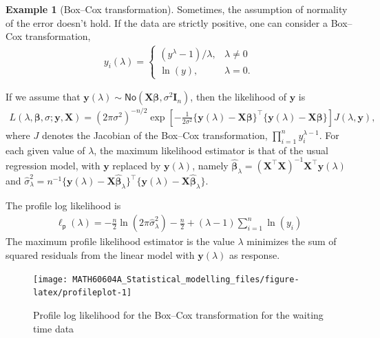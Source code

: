 \documentclass[
  11pt,
  letterpaper,
]{book}
\theoremstyle{definition}
\theoremstyle{definition}
\newtheorem{example}{Example}[chapter]
\theoremstyle{definition}
\theoremstyle{remark}
\begin{document}
\begin{example}[Box--Cox transformation]
\protect\hypertarget{exm:boxcox}{}{\label{exm:boxcox} {} }Sometimes, the assumption of normality of the error doesn't hold. If the data are strictly positive, one can consider a Box--Cox transformation,
\begin{align*}
y_i(\lambda)= \begin{cases}
(y^{\lambda}-1)/\lambda, & \lambda \neq 0\\
\ln(y), & \lambda=0.
\end{cases}
\end{align*}

If we assume that \(\boldsymbol{y}(\lambda) \sim \mathsf{No}(\mathbf{X}\boldsymbol{\beta}, \sigma^2 \mathbf{I}_n)\), then the likelihood of \(\boldsymbol{y}\) is
\begin{align*}
L(\lambda, \boldsymbol{\beta}, \sigma; \boldsymbol{y}, \mathbf{X}) = (2\pi\sigma^2)^{-n/2}\exp \left[ - \frac{1}{2\sigma^2}\{\boldsymbol{y}(\lambda) - \mathbf{X}\boldsymbol{\beta}\}^\top\{\boldsymbol{y}(\lambda) - \mathbf{X}\boldsymbol{\beta}\}\right] J(\lambda, \boldsymbol{y}),
\end{align*}
where \(J\) denotes the Jacobian of the Box--Cox transformation, \(\prod_{i=1}^n y_i^{\lambda-1}\).
For each given value of \(\lambda\), the maximum likelihood estimator is that of the usual regression model, with \(\boldsymbol{y}\) replaced by \(\boldsymbol{y}(\lambda)\), namely \(\widehat{\boldsymbol{\beta}}_\lambda = (\mathbf{X}^\top\mathbf{X})^{-1}\mathbf{X}^\top \boldsymbol{y}(\lambda)\) and \(\widehat{\sigma}^2_\lambda = n^{-1}\{ \boldsymbol{y}(\lambda) - \mathbf{X}\widehat{\boldsymbol{\beta}}_\lambda\}^\top\{ \boldsymbol{y}(\lambda) - \mathbf{X}\widehat{\boldsymbol{\beta}}_\lambda\}\).

The profile log likelihood is
\begin{align*}
\ell_{\mathsf{p}}(\lambda) = -\frac{n}{2}\ln(2\pi \widehat{\sigma}^2_\lambda) - \frac{n}{2} + (\lambda - 1)\sum_{i=1}^n \ln(y_i)
\end{align*}
The maximum profile likelihood estimator is the value \(\lambda\) minimizes the sum of squared residuals from the linear model with \(\boldsymbol{y}(\lambda)\) as response.
\end{example}

\begin{figure}

{\centering \texttt{[image: MATH60604A\_Statistical\_modelling\_files/figure-latex/profileplot-1]} 

}

\caption{Profile log likelihood for the Box--Cox transformation for the waiting time data}\label{fig:profileplot}
\end{figure}
\end{document}
